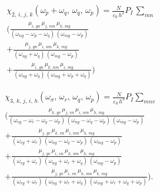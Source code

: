 \documentclass[12pt,twoside,a4paper]{article}
\numberwithin{equation}{subsection}
\numberwithin{figure}{subsection}
\begin{document}
\begin{equation} \label{eq:sresults_quadratical}
  \begin{split}
    & \chi_{2, \, i, \, j, \, k}({\omega_{p}} + {\omega_{q}}, \, {\omega_{q}}, \, {\omega_{p}}) = 
        \frac{N}{{\varepsilon_{0}}\,h^{2}}{P_{I}}\, \sum_{mn}\, 
 \\ & ( \frac{{\mu_{i, \, gn}} \, {\mu_{j,\,nm}} \, {\mu_{k, \, mg}}}
             {(\omega_{ng} - \omega_{p} - {\omega_{q}})\,({ \omega_{mg}} - {\omega_{p}})} 
 \\ & + \frac{{\mu_{j, \, gn}} \, {\mu_{i,\,nm}} \, {\mu_{k, \, mg}}}
             {(\omega_{ng} + \omega_{q})\,(\omega_{mg} - \omega_{p})}
 \\ & + \frac{{\mu_{i, \, gn}} \, {\mu_{k,\,nm}} \, {\mu_{i, \, mg}}}
             {(\omega_{ng} + \omega_{q})\,(\omega_{mg} + \omega_{p}+ \omega_{q})})
  \end{split} 
\end{equation}

\begin{equation} \label{eq:sresults_cubic}
  \begin{split}
    & \chi_{3, \,k, \,j, \,i, \,h} ({\omega_{\sigma }}, \,{\omega_{r}}, \,{\omega_{q}}, \,{\omega_{p}}) 
      = \frac{N}{{\varepsilon_{0}} \, h^{3}} {P_{I}} \! \sum_{mnv}\,
 \\ & ( \frac {{\mu_{k, \,gv}} \, {\mu_{j, \,vn}} \, {\mu_{i,\,nm}} \, {\mu_{h, \,mg}}} 
              {({\omega_{vg}} - {\omega_{r}} - {\omega_{q}} - {\omega_{p}})\,
               ({\omega_{ng}} - {\omega_{q}} - {\omega_{p}}) \,
               ({\omega_{mg}} - {\omega_{p}})} 
 \\ & + \frac {{\mu_{j, \,gv}} \, {\mu_{k, \,vn}} \, {\mu_{i, \,nm}} \, {\mu_{h, \,mg}}}
              {({\omega_{vg}} + {\omega_{r}}) \,
               ({\omega_{ng}} - {\omega_{q}} - {\omega_{p}}) \,
               ({\omega_{ mg}} - {\omega_{p}})} 
 \\ & + \frac {{\mu_{j, \,gv}} \, {\mu_{i, \,vn}} \, {\mu_{k, \,nm}} \, {\mu_{h, \,mg}}}
              {({\omega_{vg}} + {\omega_{r}}) \,
               ({\omega_{ng}} + {\omega_{r}} + {\omega_{q}}) \,
               ({\omega_{mg}} - {\omega_{p}})} 
 \\ & + \frac {{\mu_{j, \,gv}} \, {\mu_{i, \,vn}} \, {\mu_{h,\,nm}} \, {\mu_{k, \,mg}}}
              {({\omega_{vg}} + {\omega_{r}}) \, 
               ({\omega_{ng}} + {\omega_{r}} + {\omega_{q}} ) \, 
               ({\omega_{mg}} + {\omega_{r}} + {\omega_{q}} + { \omega_{p}})}).
  \end{split}
\end{equation}
\end{document}
